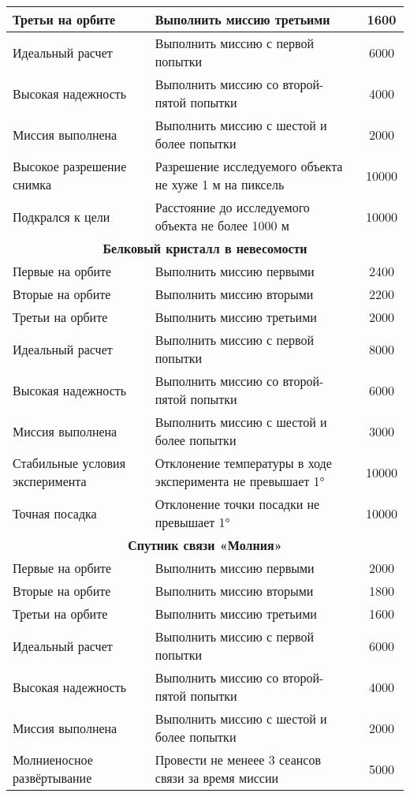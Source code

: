 \documentclass[12pt,a4paper]{article}
\begin{document}
\begin{center}
\begin{longtable}{ |p{5cm}|p{8cm}|c|}
  \hline
  Третьи на орбите & Выполнить миссию третьими & 1600\\
  \hline
  Идеальный расчет & Выполнить миссию с первой попытки & 6000\\
  \hline
  Высокая надежность & Выполнить миссию со второй-пятой попытки & 4000\\
  \hline
  Миссия выполнена & Выполнить миссию с шестой и более попытки & 2000\\
  \hline
  Высокое разрешение снимка & Разрешение исследуемого объекта не хуже 1 м на пиксель & 10000\\
  \hline
  Подкрался к цели & Расстояние до исследуемого объекта не более 1000 м & 10000\\
  \hline
  \multicolumn{3}{|c|}{\textbf{Белковый кристалл в невесомости}}\\
  \hline
  Первые на орбите & Выполнить миссию первыми & 2400\\
  \hline
  Вторые на орбите & Выполнить миссию вторыми & 2200\\
  \hline
  Третьи на орбите & Выполнить миссию третьими & 2000\\
  \hline
  Идеальный расчет & Выполнить миссию с первой попытки & 8000\\
  \hline
  Высокая надежность & Выполнить миссию со второй-пятой попытки & 6000\\
  \hline
  Миссия выполнена & Выполнить миссию с шестой и более попытки& 3000\\
  \hline
  Стабильные условия эксперимента & Отклонение температуры в ходе эксперимента не
  превышает 1° & 10000\\
  \hline
  Точная посадка & Отклонение точки посадки не превышает 1° & 10000\\
  \hline
  \multicolumn{3}{|c|}{\textbf{Спутник связи «Молния»}}\\
  \hline
  Первые на орбите & Выполнить миссию первыми & 2000\\
  \hline
  Вторые на орбите & Выполнить миссию вторыми & 1800\\
  \hline
  Третьи на орбите & Выполнить миссию третьими & 1600\\
  \hline
  Идеальный расчет & Выполнить миссию с первой попытки & 6000\\
  \hline
  Высокая надежность & Выполнить миссию со второй-пятой попытки & 4000\\
  \hline
  Миссия выполнена & Выполнить миссию с шестой и более попытки & 2000\\
  \hline
  Молниеносное развёртывание & Провести не менеее 3 сеансов связи за время миссии & 5000\\

\end{longtable}
\end{center}
\end{document}
